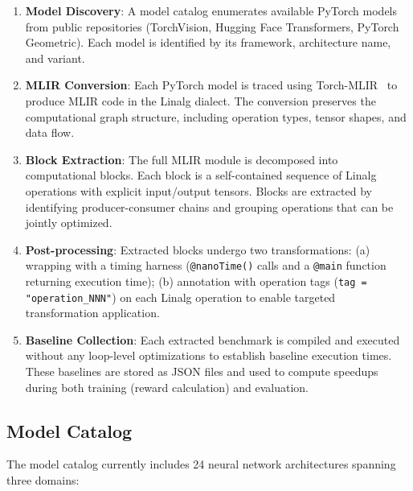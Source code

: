 \documentclass[10pt,twocolumn]{article}
\begin{document}
\begin{enumerate}
\item \textbf{Model Discovery}: A model catalog enumerates available PyTorch models from public repositories (TorchVision, Hugging Face Transformers, PyTorch Geometric). Each model is identified by its framework, architecture name, and variant.

\item \textbf{MLIR Conversion}: Each PyTorch model is traced using Torch-MLIR~\cite{ref54} to produce MLIR code in the Linalg dialect. The conversion preserves the computational graph structure, including operation types, tensor shapes, and data flow.

\item \textbf{Block Extraction}: The full MLIR module is decomposed into computational blocks. Each block is a self-contained sequence of Linalg operations with explicit input/output tensors. Blocks are extracted by identifying producer-consumer chains and grouping operations that can be jointly optimized.

\item \textbf{Post-processing}: Extracted blocks undergo two transformations: (a) wrapping with a timing harness (\texttt{@nanoTime()} calls and a \texttt{@main} function returning execution time); (b) annotation with operation tags (\texttt{tag = "operation\_NNN"}) on each Linalg operation to enable targeted transformation application.

\item \textbf{Baseline Collection}: Each extracted benchmark is compiled and executed without any loop-level optimizations to establish baseline execution times. These baselines are stored as JSON files and used to compute speedups during both training (reward calculation) and evaluation.
\end{enumerate}

\subsection{Model Catalog}

The model catalog currently includes 24 neural network architectures spanning three domains:
\end{document}
